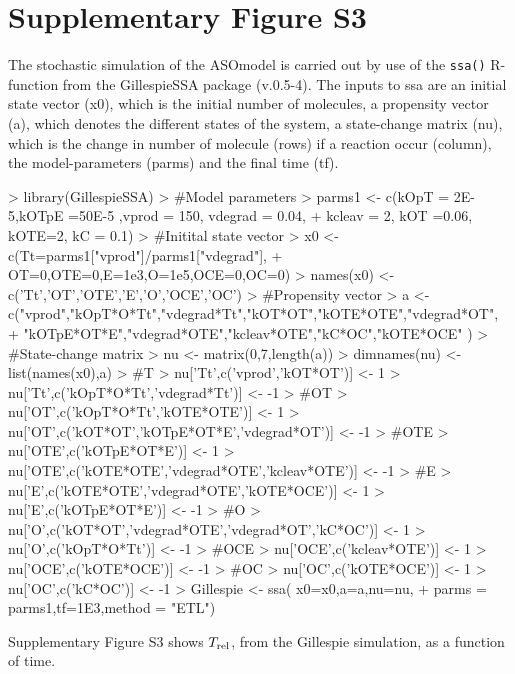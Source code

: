 \documentclass[a4paper,11pt]{article}
\newcommand{\Trel}{T_{\rm{rel}}}
\begin{document}
\section{Supplementary Figure S3}
The stochastic simulation of the ASOmodel is carried out by use of the \texttt{ssa()} R-function from the GillespieSSA package (v.0.5-4). The inputs to ssa are an initial state vector (x0), which is the initial number of molecules, a propensity vector (a), which denotes the different states of the system, a state-change matrix (nu), which is the change in number of molecule (rows) if a reaction occur (column), the model-parameters (parms) and the final time (tf).
\begin{Schunk}
\begin{Sinput}
> library(GillespieSSA)
> #Model parameters
> parms1 <- c(kOpT = 2E-5,kOTpE =50E-5 ,vprod = 150,  vdegrad = 0.04,		  
+               kcleav = 2, kOT =0.06, kOTE=2, kC = 0.1)
> #Initital state vector
> x0 <- c(Tt=parms1["vprod"]/parms1["vdegrad"],
+         OT=0,OTE=0,E=1e3,O=1e5,OCE=0,OC=0)
> names(x0) <- c('Tt','OT','OTE','E','O','OCE','OC')
> #Propensity vector
> a <-  c("vprod","kOpT*O*Tt","vdegrad*Tt","kOT*OT","kOTE*OTE","vdegrad*OT",
+         "kOTpE*OT*E","vdegrad*OTE","kcleav*OTE","kC*OC","kOTE*OCE" )
> #State-change matrix
> nu <- matrix(0,7,length(a))
> dimnames(nu) <- list(names(x0),a)
> #T
> nu['Tt',c('vprod','kOT*OT')] <- 1
> nu['Tt',c('kOpT*O*Tt','vdegrad*Tt')] <- -1 
> #OT
> nu['OT',c('kOpT*O*Tt','kOTE*OTE')] <- 1
> nu['OT',c('kOT*OT','kOTpE*OT*E','vdegrad*OT')] <- -1
> #OTE
> nu['OTE',c('kOTpE*OT*E')] <- 1
> nu['OTE',c('kOTE*OTE','vdegrad*OTE','kcleav*OTE')] <- -1
> #E
> nu['E',c('kOTE*OTE','vdegrad*OTE','kOTE*OCE')] <- 1
> nu['E',c('kOTpE*OT*E')] <- -1
> #O
> nu['O',c('kOT*OT','vdegrad*OTE','vdegrad*OT','kC*OC')] <- 1
> nu['O',c('kOpT*O*Tt')] <- -1
> #OCE
> nu['OCE',c('kcleav*OTE')] <- 1
> nu['OCE',c('kOTE*OCE')] <- -1
> #OC
> nu['OC',c('kOTE*OCE')] <- 1
> nu['OC',c('kC*OC')] <- -1
> Gillespie <- ssa( x0=x0,a=a,nu=nu,
+       parms = parms1,tf=1E3,method = "ETL")
\end{Sinput}
\end{Schunk}
Supplementary Figure S3 shows $\Trel$, from the Gillespie simulation, as a function of time.
\end{document}

